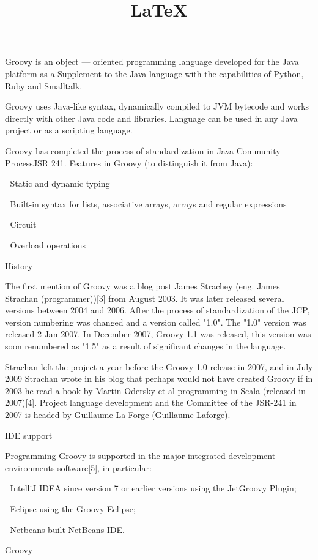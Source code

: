 \documentclass[12pt]{article}
\title{\LaTeX}
\date{}
\author{}
\begin{document}
 
\maketitle 
Groovy is an object — oriented programming language developed for the Java platform as a Supplement to the Java language with the capabilities of Python, Ruby and Smalltalk.{}

Groovy uses Java-like syntax, dynamically compiled to JVM bytecode and works directly with other Java code and libraries. Language can be used in any Java project or as a scripting language.{}

Groovy has completed the process of standardization in Java Community ProcessJSR 241.
Features in Groovy (to distinguish it from Java):{}

 Static and dynamic typing{}

 Built-in syntax for lists, associative arrays, arrays and regular expressions{}

 Circuit{}

 Overload operations{}

History{}

The first mention of Groovy was a blog post James Strachey (eng. James Strachan (programmer))[3] from August 2003. It was later released several versions between 2004 and 2006. After the process of standardization of the JCP, version numbering was changed and a version called "1.0". The "1.0" version was released 2 Jan 2007. In December 2007, Groovy 1.1 was released, this version was soon renumbered as "1.5" as a result of significant changes in the language.{}

Strachan left the project a year before the Groovy 1.0 release in 2007, and in July 2009 Strachan wrote in his blog that perhaps would not have created Groovy if in 2003 he read a book by Martin Odersky et al programming in Scala (released in 2007)[4].
Project language development and the Committee of the JSR-241 in 2007 is headed by Guillaume La Forge (Guillaume Laforge).{}

IDE support{}

Programming Groovy is supported in the major integrated development environments software[5], in particular:{}

 IntelliJ IDEA since version 7 or earlier versions using the JetGroovy Plugin;{}

 Eclipse using the Groovy Eclipse;{}

 Netbeans built NetBeans IDE.{}

Groovy{}
\end{document}
